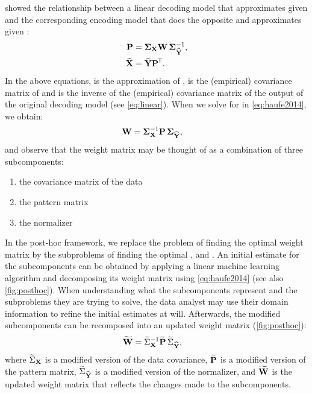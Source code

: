 \documentclass[a4paper]{vanvliet_paper}
\newcommand{\modcov}{\widetilde{\Sigma}_{\mat{X}}}
\newcommand{\modpat}{\widetilde{\mat{P}}}
\newcommand{\modnorm}{\widetilde{\Sigma}_{\emat{Y}}}
\newcommand{\modweights}{\widetilde{\mat{W}}}
\newcommand{\tmodcov}{$\modcov$\xspace}
\newcommand{\tmodpat}{$\modpat$\xspace}
\newcommand{\tmodnorm}{$\modnorm$\xspace}
\newcommand{\tmodweights}{$\modweights$\xspace}
\begin{document}
\textcite{Haufe2014} showed the relationship between a linear decoding model  that approximates  given  and the corresponding encoding model  that does the opposite and approximates  given :
\begin{align}
    \mathbf{P} &= \mathbf{\Sigma}_{\mathbf{X}}\mathbf{W}\,\mathbf{\Sigma}^{-1}_{\mathbf{\widehat{\mathbf{Y}}}}, \label{eq:haufe2014} \\
    \widehat{\mathbf{X}} &= \widehat{\mathbf{Y}}\mathbf{P}^{\mkern-1.5mu\mathsf{T}}.
\end{align}
In the above equations,  is the approximation of ,  is the (empirical) covariance matrix of  and  is the inverse of the (empirical) covariance matrix of the output of the original decoding model (see \autoref{eq:linear}).
When we solve for  in \autoref{eq:haufe2014}, we obtain:
\begin{align}
    \mathbf{W} &= \mathbf{\Sigma}^{-1}_{\mathbf{X}}\mathbf{P}\,\mathbf{\Sigma}_{\mathbf{\widehat{\mathbf{Y}}}}, \label{eq:vanvliet2018}
\end{align}
and observe that the weight matrix may be thought of as a combination of three subcomponents: 
\begin{enumerate}
    \item the covariance matrix of the data 
    \item the pattern matrix 
    \item the normalizer 
\end{enumerate}
In the post-hoc framework, we replace the problem of finding the optimal weight matrix by the subproblems of finding the optimal ,  and .
An initial estimate for the subcomponents can be obtained by applying a linear machine learning algorithm and decomposing its weight matrix using \autoref{eq:haufe2014} (see also \autoref{fig:posthoc}).
When understanding what the subcomponents represent and the subproblems they are trying to solve, the data analyst may use their domain information to refine the initial estimates at will.
Afterwards, the modified subcomponents can be recomposed into an updated weight matrix (\autoref{fig:posthoc}):
\begin{align}\label{eq:posthoc}
    \modweights &= {\modcov}^{-1}\modpat\,\modnorm,
\end{align}
where \tmodcov is a modified version of the data covariance,
\tmodpat is a modified version of the pattern matrix,
\tmodnorm is a modified version of the normalizer,
and \tmodweights is the updated weight matrix that reflects the changes made to the subcomponents.
\end{document}
